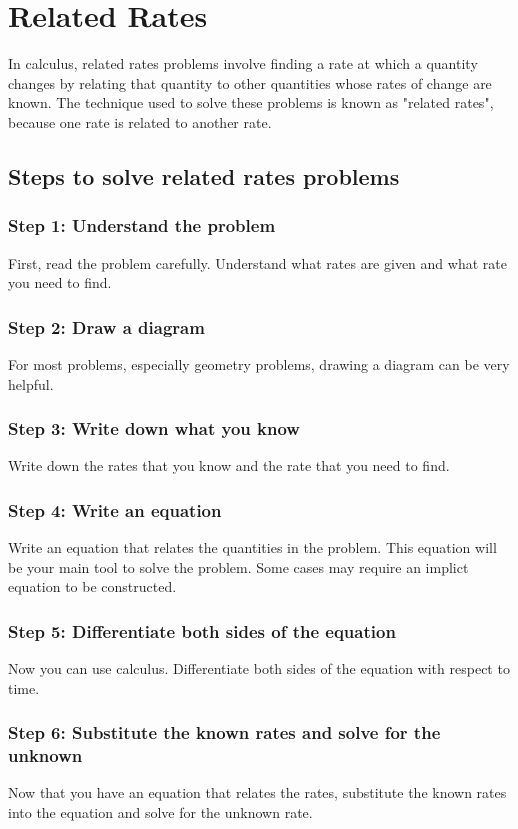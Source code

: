 \chapter{Related Rates}
In calculus, related rates problems involve finding a rate at which a quantity changes by relating that quantity to other quantities whose rates of change are known. The technique used to solve these problems is known as "related rates", because one rate is related to another rate.

\section{Steps to solve related rates problems}

\subsection{Step 1: Understand the problem}
First, read the problem carefully. Understand what rates are given and what rate you need to find.

\subsection{Step 2: Draw a diagram}
For most problems, especially geometry problems, drawing a diagram can be very helpful.

\subsection{Step 3: Write down what you know}
Write down the rates that you know and the rate that you need to find.

\subsection{Step 4: Write an equation}
Write an equation that relates the quantities in the problem. This equation will be your main tool to solve the problem. Some cases may require an implict equation to be constructed. 

\subsection{Step 5: Differentiate both sides of the equation}
Now you can use calculus. Differentiate both sides of the equation with respect to time.

\subsection{Step 6: Substitute the known rates and solve for the unknown}
Now that you have an equation that relates the rates, substitute the known rates into the equation and solve for the unknown rate.


